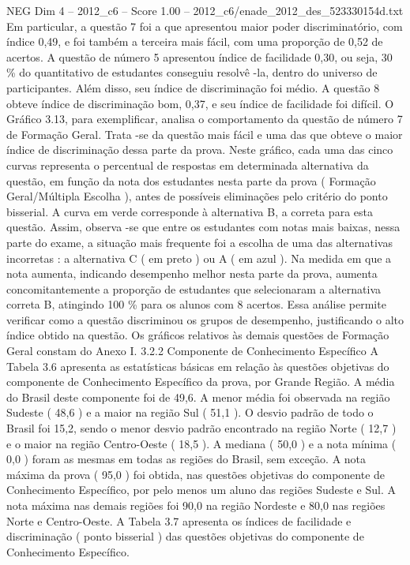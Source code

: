 \begin{textsample}{NEG Dim 4 – 2012\_c6 – Score 1.00 – 2012\_c6/enade\_2012\_des\_523330154d.txt}
Em particular, a questão 7 foi a que apresentou maior poder discriminatório, com índice 0,49, e foi também a terceira mais fácil, com uma proporção de 0,52 de acertos.
A questão de número 5 apresentou índice de facilidade 0,30, ou seja, 30 \% do quantitativo de estudantes conseguiu resolvê -la, dentro do universo de participantes.
Além disso, seu índice de discriminação foi médio.
A questão 8 obteve índice de discriminação bom, 0,37, e seu índice de facilidade foi difícil.
O Gráfico 3.13, para exemplificar, analisa o comportamento da questão de número 7 de Formação Geral.
Trata -se da questão mais fácil e uma das que obteve o maior índice de discriminação dessa parte da prova.
Neste gráfico, cada uma das cinco curvas representa o percentual de respostas em determinada alternativa da questão, em função da nota dos estudantes nesta parte da prova ( Formação Geral/Múltipla Escolha ), antes de possíveis eliminações pelo critério do ponto bisserial.
A curva em verde corresponde à alternativa B, a correta para esta questão.
Assim, observa -se que entre os estudantes com notas mais baixas, nessa parte do exame, a situação mais frequente foi a escolha de uma das alternativas incorretas : a alternativa C ( em preto ) ou A ( em azul ).
Na medida em que a nota aumenta, indicando desempenho melhor nesta parte da prova, aumenta concomitantemente a proporção de estudantes que selecionaram a alternativa correta B, atingindo 100 \% para os alunos com 8 acertos.
Essa análise permite verificar como a questão discriminou os grupos de desempenho, justificando o alto índice obtido na questão.
Os gráficos relativos às demais questões de Formação Geral constam do Anexo I. 3.2.2 Componente de Conhecimento Específico A Tabela 3.6 apresenta as estatísticas básicas em relação às questões objetivas do componente de Conhecimento Específico da prova, por Grande Região.
A média do Brasil deste componente foi de 49,6.
A menor média foi observada na região Sudeste ( 48,6 ) e a maior na região Sul ( 51,1 ).
O desvio padrão de todo o Brasil foi 15,2, sendo o menor desvio padrão encontrado na região Norte ( 12,7 ) e o maior na região Centro-Oeste ( 18,5 ).
A mediana ( 50,0 ) e a nota mínima ( 0,0 ) foram as mesmas em todas as regiões do Brasil, sem exceção.
A nota máxima da prova ( 95,0 ) foi obtida, nas questões objetivas do componente de Conhecimento Específico, por pelo menos um aluno das regiões Sudeste e Sul.
A nota máxima nas demais regiões foi 90,0 na região Nordeste e 80,0 nas regiões Norte e Centro-Oeste.
A Tabela 3.7 apresenta os índices de facilidade e discriminação ( ponto bisserial ) das questões objetivas do componente de Conhecimento Específico.

\end{textsample}
